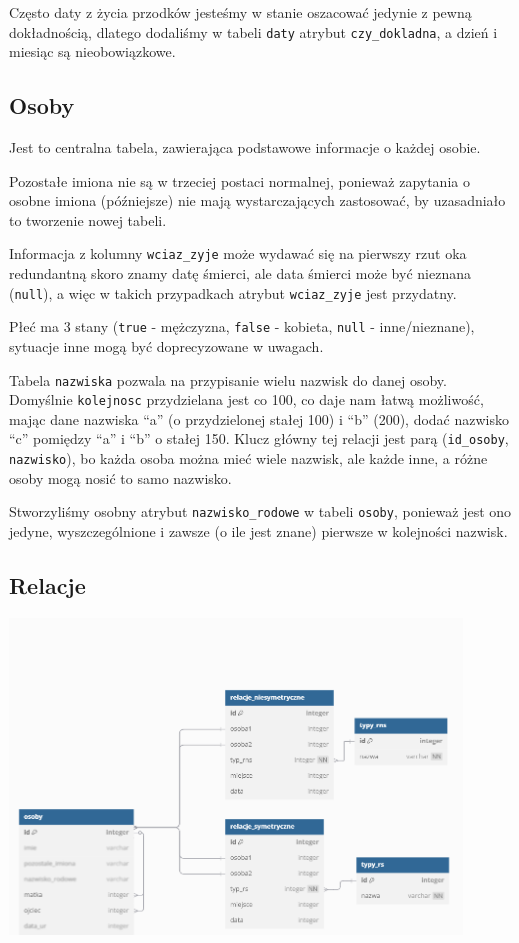 \documentclass{article}
\begin{document}
Często daty z życia przodków jesteśmy w stanie oszacować jedynie z pewną dokładnością, dlatego dodaliśmy w tabeli \texttt{daty} atrybut \texttt{czy\_dokladna}, a dzień i miesiąc są nieobowiązkowe.

\subsection{Osoby}
Jest to centralna tabela, zawierająca podstawowe informacje o każdej osobie.

Pozostałe imiona nie są w trzeciej postaci normalnej, ponieważ zapytania o osobne imiona (późniejsze) nie mają wystarczających zastosować, by uzasadniało to tworzenie nowej tabeli.

Informacja z kolumny \texttt{wciaz\_zyje} może wydawać się na pierwszy rzut oka redundantną skoro znamy datę śmierci, ale data śmierci może być nieznana (\texttt{null}), a więc w takich przypadkach atrybut \texttt{wciaz\_zyje} jest przydatny.

Płeć ma 3 stany (\texttt{true} - mężczyzna, \texttt{false} - kobieta, \texttt{null} - inne/nieznane), sytuacje inne mogą być doprecyzowane w uwagach.

Tabela \texttt{nazwiska} pozwala na przypisanie wielu nazwisk do danej osoby. Domyślnie \texttt{kolejnosc} przydzielana jest co 100, co daje nam łatwą możliwość, mając dane nazwiska “a” (o przydzielonej stałej 100) i “b” (200), dodać nazwisko “c” pomiędzy “a” i “b” o stałej 150. Klucz główny tej relacji jest parą (\texttt{id\_osoby}, \texttt{nazwisko}), bo każda osoba można mieć wiele nazwisk, ale każde inne, a różne osoby mogą nosić to samo nazwisko.

Stworzyliśmy osobny atrybut \texttt{nazwisko\_rodowe} w tabeli \texttt{osoby}, ponieważ jest ono jedyne, wyszczególnione i zawsze (o ile jest znane) pierwsze w kolejności nazwisk.

\subsection{Relacje}

\begin{center}
    \includegraphics[width=0.9\textwidth]{img/Database_plan_a}
\end{center}
\end{document}
